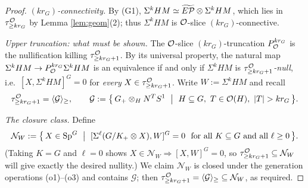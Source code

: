 \begin{proof}
\emph{$(kr_G)$-connectivity.} By (G1), $\Sigma^k HM\simeq\widetilde{E\mathcal P}\otimes\Sigma^k HM$,
which lies in $\tau^{\mathcal{O}}_{\ge k r_G}$ by Lemma \ref{lem:geom}(2); thus
$\Sigma^k HM$ is $\mathcal{O}$-slice $(k r_G)$-connective.

\emph{Upper truncation: what must be shown.} The $\mathcal{O}$-slice $(k r_G)$-truncation
$P^{k r_G}_{\mathcal{O}}$ is the nullification killing $\tau^{\mathcal{O}}_{\ge k r_G+1}$. By its
universal property, the natural map $\Sigma^kHM\to P^{kr_G}_{\mathcal{O}}\Sigma^kHM$ is an
equivalence if and only if $\Sigma^kHM$ is \emph{$\tau^{\mathcal{O}}_{\ge kr_G+1}$-null},
i.e.\ $[X,\Sigma^kHM]^G=0$ for \emph{every} $X\in\tau^{\mathcal{O}}_{\ge kr_G+1}$. Write
$W:=\Sigma^kHM$ and recall
\[
\tau^\qfiveaO_{\ge kr_G+1}=\langle\mathcal G\rangle_{\ge},\qquad
\mathcal G:=\bigl\{\,G_+\otimes_H N^T S^1\ \bigm|\ H\subseteq G,\ T\in\qfiveaO(H),\ |T|>k r_G\,\bigr\}.
\]

\emph{The closure class.} Define
\[
\mathcal N_W:=\bigl\{\,X\in\mathrm{Sp}^G\ \bigm|\
[\Sigma^\ell(G/K_+\otimes X),W]^G=0\ \text{ for all }K\subseteq G\text{ and all }\ell\ge0\,\bigr\}.
\]
(Taking $K=G$ and $\ell=0$ shows $X\in\mathcal N_W\Rightarrow[X,W]^G=0$, so
$\tau^{\mathcal{O}}_{\ge kr_G+1}\subseteq\mathcal N_W$ will give exactly the desired
nullity.) We claim $\mathcal N_W$ is closed under the generation operations
(o1)--(o3) and contains $\mathcal G$; then
$\tau^{\mathcal{O}}_{\ge kr_G+1}=\langle\mathcal G\rangle_{\ge}\subseteq\mathcal N_W$, as
required.


\end{proof}
